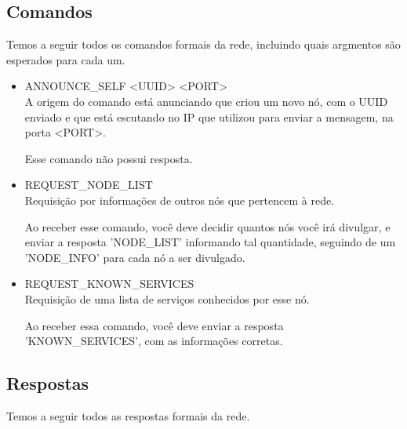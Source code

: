     \subsection{Comandos}
      Temos a seguir todos os comandos formais da rede, incluindo quais argmentos são esperados
      para cada um.
        
      \begin{itemize}
        \item ANNOUNCE\_SELF <UUID> <PORT> \\
          A origem do comando está anunciando que criou um novo nó, com o UUID enviado e que está
          escutando no IP que utilizou para enviar a mensagem, na porta <PORT>.
          
          Esse comando não possui resposta.
      
        \item REQUEST\_NODE\_LIST \\
          Requisição por informações de outros nós que pertencem à rede.
          
          Ao receber esse comando, você deve decidir quantos nós você irá divulgar, e enviar a
          resposta 'NODE\_LIST' informando tal quantidade, seguindo de um 'NODE\_INFO' para cada
          nó a ser divulgado.
          
        \item REQUEST\_KNOWN\_SERVICES \\
          Requisição de uma lista de serviços conhecidos por esse nó.
          
          Ao receber essa comando, você deve enviar a resposta 'KNOWN\_SERVICES', com as
          informações corretas.
          
      \end{itemize}
      
    \subsection{Respostas}
      Temos a seguir todos as respostas formais da rede.
      
